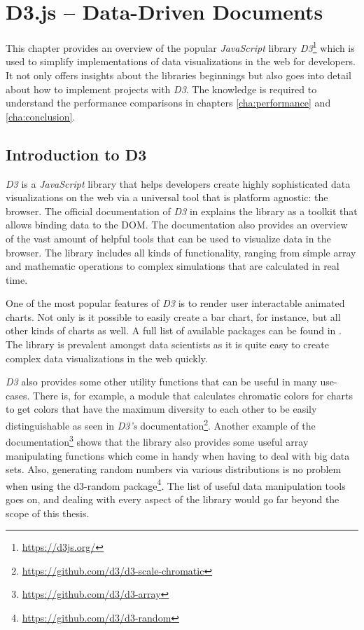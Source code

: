 \chapter{D3.js – Data-Driven Documents}
\label{cha:d3js}

This chapter provides an overview of the popular \emph{JavaScript} library \emph{D3}\footnote{\url{https://d3js.org/}} which is used to simplify implementations of data visualizations in the web for developers. It not only offers insights about the libraries beginnings but also goes into detail about how to implement projects with \emph{D3}. The knowledge is required to understand the performance comparisons in chapters \ref{cha:performance} and \ref{cha:conclusion}.


\section{Introduction to D3}

\emph{D3} is a \emph{JavaScript} library that helps developers create highly sophisticated data visualizations on the web via a universal tool that is platform agnostic: the browser. The official documentation of \emph{D3} in \cite{D3Website} explains the library as a toolkit that allows binding data to the DOM. The documentation also provides an overview of the vast amount of helpful tools that can be used to visualize data in the browser. The library includes all kinds of functionality, ranging from simple array and mathematic operations to complex simulations that are calculated in real time.

One of the most popular features of \emph{D3} is to render user interactable animated charts. Not only is it possible to easily create a bar chart, for instance, but all other kinds of charts as well. A full list of available packages can be found in \cite{D3Github}. The library is prevalent amongst data scientists as it is quite easy to create complex data visualizations in the web quickly.

\emph{D3} also provides some other utility functions that can be useful in many use-cases. There is, for example, a module that calculates chromatic colors for charts to get colors that have the maximum diversity to each other to be easily distinguishable as seen in \emph{D3's} documentation\footnote{\url{https://github.com/d3/d3-scale-chromatic}}. Another example of the documentation\footnote{\url{https://github.com/d3/d3-array}} shows that the library also provides some useful array manipulating functions which come in handy when having to deal with big data sets. Also, generating random numbers via various distributions is no problem when using the d3-random package\footnote{\url{https://github.com/d3/d3-random}}. The list of useful data manipulation tools goes on, and dealing with every aspect of the library would go far beyond the scope of this thesis. 


